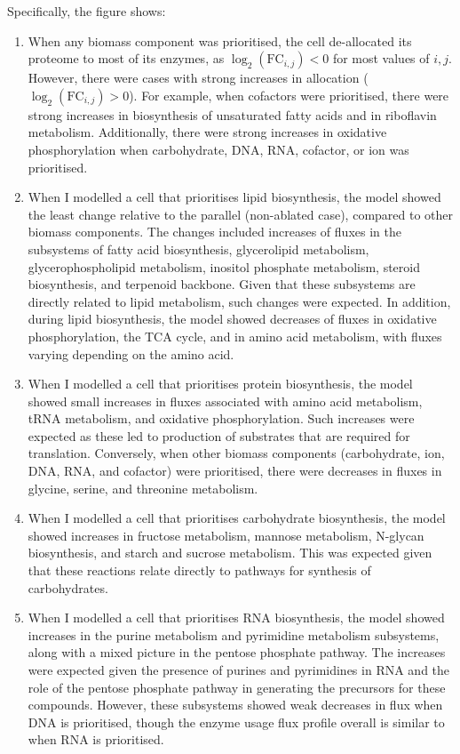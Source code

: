 Specifically, the figure shows:
\begin{enumerate}
  \item When any biomass component was prioritised, the cell de-allocated its proteome to most of its enzymes, as $\log_{2}(\mathrm{FC}_{i,j}) < 0$ for most values of $i, j$.
        However, there were cases with strong increases in allocation ($\log_{2}(\mathrm{FC}_{i,j}) > 0$).
        For example, when cofactors were prioritised, there were strong increases in biosynthesis of unsaturated fatty acids and in riboflavin metabolism.
        Additionally, there were strong increases in oxidative phosphorylation when carbohydrate, DNA, RNA, cofactor, or ion was prioritised.
  \item When I modelled a cell that prioritises lipid biosynthesis, the model showed the least change relative to the parallel (non-ablated case), compared to other biomass components.
        The changes included increases of fluxes in the subsystems of fatty acid biosynthesis, glycerolipid metabolism, glycerophospholipid metabolism, inositol phosphate metabolism, steroid biosynthesis, and terpenoid backbone.
        Given that these subsystems are directly related to lipid metabolism, such changes were expected.
        In addition, during lipid biosynthesis, the model showed decreases of fluxes in oxidative phosphorylation, the TCA cycle, and in amino acid metabolism, with fluxes varying depending on the amino acid.
  \item When I modelled a cell that prioritises protein biosynthesis, the model showed small increases in fluxes associated with amino acid metabolism, tRNA metabolism, and oxidative phosphorylation.
        Such increases were expected as these led to production of substrates that are required for translation.
        Conversely, when other biomass components (carbohydrate, ion, DNA, RNA, and cofactor) were prioritised, there were decreases in fluxes in glycine, serine, and threonine metabolism.
  \item When I modelled a cell that prioritises carbohydrate biosynthesis, the model showed increases in fructose metabolism, mannose metabolism, N-glycan biosynthesis, and starch and sucrose metabolism.
        This was expected given that these reactions relate directly to pathways for synthesis of carbohydrates.
  \item When I modelled a cell that prioritises RNA biosynthesis, the model showed increases in the purine metabolism and pyrimidine metabolism subsystems, along with a mixed picture in the pentose phosphate pathway.
        The increases were expected given the presence of purines and pyrimidines in RNA and the role of the pentose phosphate pathway in generating the precursors for these compounds.
        However, these subsystems showed weak decreases in flux when DNA is prioritised, though the enzyme usage flux profile overall is similar to when RNA is prioritised.
\end{enumerate}

